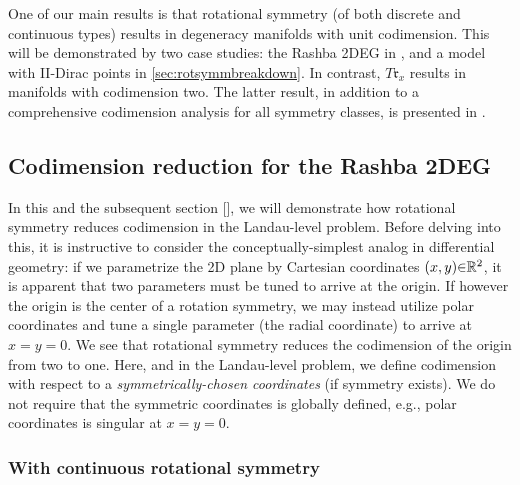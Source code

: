 \documentclass[aps, prb, showpacs, twocolumn, notitlepage, superscriptaddress]{revtex4-1}
\begin{document}
One of our main results is that  rotational symmetry (of both discrete and continuous types) results in degeneracy manifolds with unit codimension. This will be demonstrated by two  case studies: the Rashba 2DEG in , and a model with II-Dirac points in \ref{sec:rotsymmbreakdown}. In contrast,  $T\mathfrak{r}_x$ results in manifolds with codimension two. The latter result, in addition to a comprehensive codimension analysis for all symmetry classes, is presented in . 





\subsection{Codimension reduction for the Rashba 2DEG}


In this and the subsequent section [], we will demonstrate how rotational symmetry reduces codimension in the Landau-level problem. Before delving into this, it is instructive to consider the conceptually-simplest analog in differential geometry: if we parametrize the 2D plane by Cartesian coordinates $(x,y){\in}\mathbb{R}^2$, it is apparent that two parameters must be tuned to arrive at the origin. If however the origin is the center of a rotation symmetry, we may instead utilize polar coordinates and tune a single parameter (the radial coordinate) to arrive at $x{=}y{=}0$. We see that rotational symmetry reduces the codimension of the origin from two to one. Here, and in the  Landau-level problem, we define codimension with respect to a \textit{symmetrically-chosen coordinates} (if symmetry exists). We do not require that the symmetric coordinates is globally defined, e.g., polar coordinates is singular at $x{=}y{=}0$.


\subsubsection{With continuous rotational symmetry}
\end{document}
